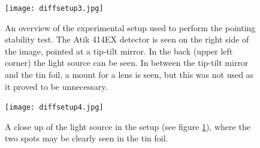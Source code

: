 \documentclass[../main.tex]{subfiles}
\begin{document}
\newpage
\begin{figure}[h!]
	\centering
	\texttt{[image: diffsetup3.jpg]}
	\caption{An overview of the experimental setup used to perform the pointing stability test. The Atik 414EX detector is seen on the right side of the image, pointed at a tip-tilt mirror. In the back (upper left corner) the light source can be seen. In between the tip-tilt mirror and the tin foil, a mount for a lens is seen, but this was not used as it proved to be unnecessary.}
	\label{fig:diffsetup}
\end{figure}
\newpage
\begin{figure}[h!]
	\centering
	\texttt{[image: diffsetup4.jpg]}
	\caption{A close up of the light source in the setup (see figure \ref{fig:diffsetup}), where the two spots may be clearly seen in the tin foil.}
	\label{fig:diffsetup2}
\end{figure}
\newpage

\end{document}
